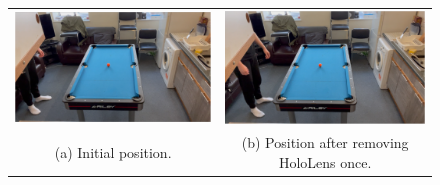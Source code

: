 \documentclass[ %
                author={Finn Alexander Wilkinson},
                supervisor={Dr. Andrew Calway},
                degree={MEng},
                title={\centering A Mixed Reality Aim Assistant for Pool and Snooker},
                subtitle={},
                type={Enterprise},
                year={2021} ]{dissertation}
\begin{document}
\begin{figure}[h!]
    \centering
    \begin{tabular}{cc}
         \includegraphics[scale = 0.15]{Images/Eval/Remove Headset/Frame 1 - 0 removes.PNG} & \includegraphics[scale = 0.15]{Images/Eval/Remove Headset/Frame 2 - 1 removes.PNG} \\
         (a) Initial position. & (b) Position after removing HoloLens once. \\[6pt]

\end{tabular}
\end{figure}
\end{document}
